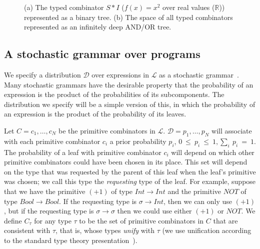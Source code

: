 \documentclass{article}
\begin{document}
\begin{figure}
\begin{subfigure}[After]{0.5\linewidth}
    \caption{  \label{fig:andor}}
    \end{subfigure}
  \caption{(a) The typed combinator $S * I$ ($f(x)=x^2$ over real values ($\mathbb{R}$)) represented as a
    binary tree. (b) The space of all typed combinators represented as an
    infinitely deep AND/OR tree.}

\end{figure}

\subsection{A stochastic grammar over programs}
\label{sec:stochgrammar}

We specify a distribution $\mathcal{D}$ over expressions in
$\mathcal{L}$ as a stochastic
grammar~\cite{feldman1969grammatical}. Many stochastic grammars have
the desirable property that the probability of an expression is the
product of the probabilities of its subcomponents. The distribution we
specify will be a simple version of this, in which the
probability of an expression is the product of the probability of its
leaves.

Let ${C = c_1, \dots, c_N }$ be the primitive combinators in
$\mathcal{L}$. ${ \mathcal{D}=p_1, \dots, p_N }$ will associate with
each primitive combinator $c_i$ a prior probability $p_i$,
$0~\leq~p_i~\leq~1, \sum_i~p_i~=~1 $. The probability of a leaf with
primitive combinator $c_i$ will depend on which other primitive
combinators could have been chosen in its place. This set will depend
on the type that was requested by the parent of this leaf when the
leaf's primitive was chosen; we call this type the \emph{requesting}
type of the leaf. For example, suppose that we have the primitive
$(+1)$ of type $Int \rightarrow Int$ and the primitive $NOT$ of type
$Bool \rightarrow Bool$. If the requesting type is $\sigma \rightarrow
Int$, then we can only use $(+1)$, but if the requesting type is
$\sigma \rightarrow \sigma$ then we could use either $(+1)$ or
$NOT$. We define $C_\tau$ for any type $\tau$ to be the set of
primitive combinators in $C$ that are consistent with $\tau$, that is,
whose types \emph{unify} with $\tau$ (we use unification according to
the standard type theory presentation~\cite{Pierce_2002}).
\end{document}
